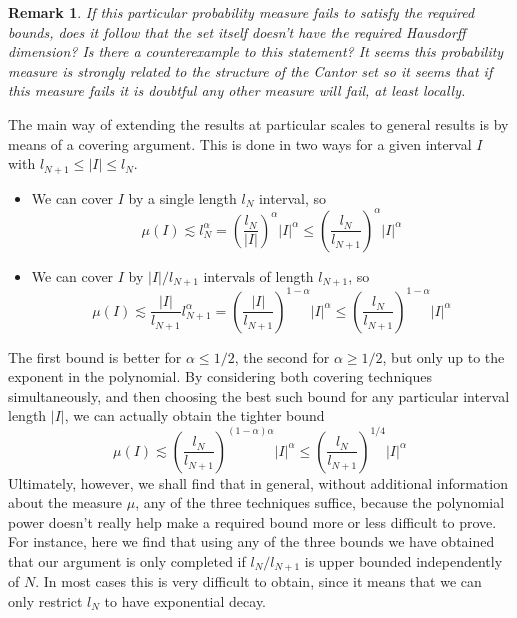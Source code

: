 \documentclass{report}
\theoremstyle{plain}
\theoremstyle{plain}
\newtheorem*{remark}{Remark}
\begin{document}
\begin{remark}
    If this particular probability measure fails to satisfy the required bounds, does it follow that the set itself doesn't have the required Hausdorff dimension? Is there a counterexample to this statement? It seems this probability measure is strongly related to the structure of the Cantor set so it seems that if this measure fails it is doubtful any other measure will fail, at least locally.
\end{remark}

The main way of extending the results at particular scales to general results is by means of a covering argument. This is done in two ways for a given interval $I$ with $l_{N+1} \leq |I| \leq l_N$.
%
\begin{itemize}
    \item We can cover $I$ by a single length $l_N$ interval, so
    \[ \mu(I) \lesssim l_N^\alpha = \left( \frac{l_N}{|I|} \right)^\alpha |I|^\alpha \leq \left( \frac{l_N}{l_{N+1}} \right)^\alpha |I|^\alpha \]
    \item We can cover $I$ by $|I|/l_{N+1}$ intervals of length $l_{N+1}$, so
    \[ \mu(I) \lesssim \frac{|I|}{l_{N+1}} l_{N+1}^\alpha = \left( \frac{|I|}{l_{N+1}} \right)^{1 - \alpha} |I|^\alpha \leq \left( \frac{l_N}{l_{N+1}} \right)^{1 - \alpha} |I|^\alpha \]
\end{itemize}
%
The first bound is better for $\alpha \leq 1/2$, the second for $\alpha \geq 1/2$, but only up to the exponent in the polynomial. By considering both covering techniques simultaneously, and then choosing the best such bound for any particular interval length $|I|$, we can actually obtain the tighter bound
%
\[ \mu(I) \lesssim \left( \frac{l_N}{l_{N+1}} \right)^{(1-\alpha)\alpha} |I|^\alpha \leq \left( \frac{l_N}{l_{N+1}} \right)^{1/4} |I|^\alpha \]
%
Ultimately, however, we shall find that in general, without additional information about the measure $\mu$, any of the three techniques suffice, because the polynomial power doesn't really help make a required bound more or less difficult to prove. For instance, here we find that using any of the three bounds we have obtained that our argument is only completed if $l_N/l_{N+1}$ is upper bounded independently of $N$. In most cases this is very difficult to obtain, since it means that we can only restrict $l_N$ to have exponential decay.
\end{document}
